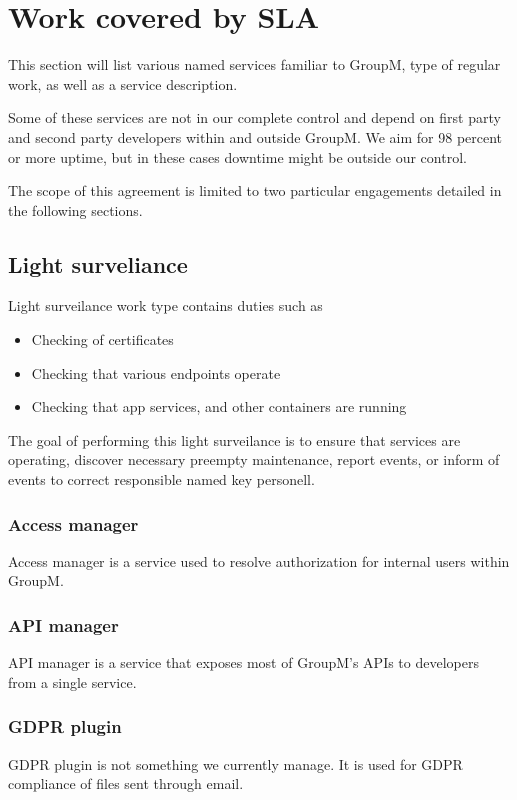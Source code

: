 \section{Work covered by SLA}
This section will list various named services familiar to GroupM, type of regular work, as well as a service description.

Some of these services are not in our complete control and depend on first party and second party developers within and outside GroupM. We aim for 98 percent or more uptime, but in these cases downtime might be outside our control.

The scope of this agreement is limited to two particular engagements detailed in the following sections. 

%

\subsection{Light surveliance}

Light surveilance work type contains duties such as
\begin{itemize}
\item Checking of certificates
\item Checking that various endpoints operate
\item Checking that app services, and other containers are running
\end{itemize}

The goal of performing this light surveilance is to ensure that services are operating, discover necessary preempty maintenance, report events, or inform of events to correct responsible named key personell.


\subsubsection{Access manager}
Access manager is a service used to resolve authorization for internal users within GroupM. 

\subsubsection{API manager}
API manager is a service that exposes most of GroupM's APIs to developers from a single service.


\subsubsection{GDPR plugin}
GDPR plugin is not something we currently manage. It is used for GDPR compliance of files sent through email.


